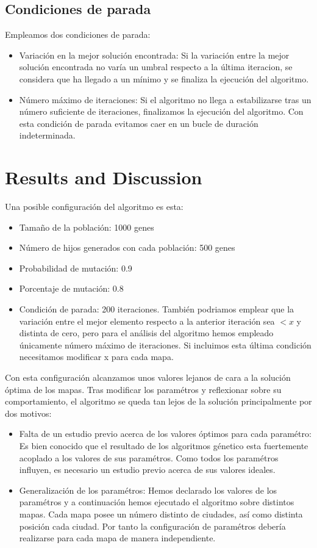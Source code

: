 \documentclass{article}
\begin{document}
\subsection{Condiciones de parada}
Empleamos dos condiciones de parada:
\begin{itemize}
    \item Variación en la mejor solución encontrada: Si la variación entre la mejor solución encontrada no varía un umbral
    respecto a la última iteracion, se considera que ha llegado a un mínimo y se finaliza la ejecución del algoritmo.
    \item Número máximo de iteraciones: Si el algoritmo no llega a estabilizarse tras un número suficiente de iteraciones, 
    finalizamos la ejecución del algoritmo. Con esta condición de parada evitamos caer en un bucle de duración indeterminada. 
\end{itemize}

\section{Results and Discussion}
Una posible configuración del algoritmo es esta:
\begin{itemize}
    \item Tamaño de la población: 1000 genes
    \item Número de hijos generados con cada población: 500 genes
    \item Probabilidad de mutación: 0.9
    \item Porcentaje de mutación: 0.8 
    \item Condición de parada: 200 iteraciones. También podriamos emplear que la variación entre el mejor elemento  respecto 
    a la anterior iteración sea $ < x$ y distinta de cero, pero para el análisis del algoritmo hemos empleado únicamente número 
    máximo de iteraciones. Si incluimos esta última condición necesitamos modificar x para cada mapa.   
\end{itemize}
Con esta configuración alcanzamos unos valores lejanos de cara a la solución óptima de los mapas. Tras modificar los paramétros y reflexionar 
sobre su comportamiento, el algoritmo se queda tan lejos de la solución principalmente por dos motivos:

\begin{itemize}
    \item Falta de un estudio previo acerca de los valores óptimos para cada paramétro: Es bien conocido que el resultado de los algoritmos 
    génetico esta fuertemente acoplado a los valores de sus paramétros. Como todos los paramétros influyen, es necesario un estudio previo acerca 
    de sus valores ideales.  
    \item Generalización de los paramétros: Hemos declarado los valores de los paramétros y a continuación hemos ejecutado el  algoritmo sobre 
    distintos mapas. Cada mapa posee un número distinto de ciudades, así como distinta posición cada ciudad. Por tanto la configuración de 
    paramétros debería realizarse para cada mapa de manera independiente. 
\end{itemize}
\end{document}
